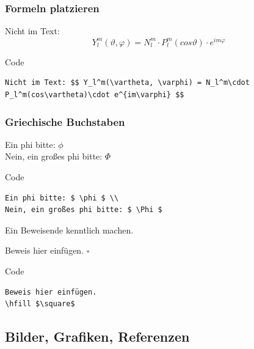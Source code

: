 \begin{frame}[fragile]
  \frametitle{Formeln platzieren}
  \begin{example}
    Nicht im Text: $$ Y_l^m(\vartheta, \varphi) = N_l^m\cdot P_l^m(cos\vartheta)\cdot e^{im\varphi} $$
  \end{example}
  \pause
  \begin{block}{Code}
	 \begin{verbatim}
Nicht im Text: $$ Y_l^m(\vartheta, \varphi) = N_l^m\cdot
P_l^m(cos\vartheta)\cdot e^{im\varphi} $$
		\end{verbatim}
	\end{block}
\end{frame}

\begin{frame}[fragile]
  \frametitle{Griechische Buchstaben}
  \begin{example}
    Ein phi bitte: $ \phi $ \\
    Nein, ein großes phi bitte: $ \Phi $
  \end{example}
  \pause
  \begin{block}{Code}
   \begin{verbatim}
Ein phi bitte: $ \phi $ \\
Nein, ein großes phi bitte: $ \Phi $
    \end{verbatim}
  \end{block}
\end{frame}

\begin{frame}[fragile]
  Ein Beweisende kenntlich machen.
  \begin{example}
    Beweis hier einfügen.
    \hfill $\square$
  \end{example}
  \pause
  \begin{block}{Code}
    \begin{verbatim}
Beweis hier einfügen.
\hfill $\square$
    \end{verbatim}
  \end{block}
\end{frame}

\subsection{Bilder, Grafiken, Referenzen}


